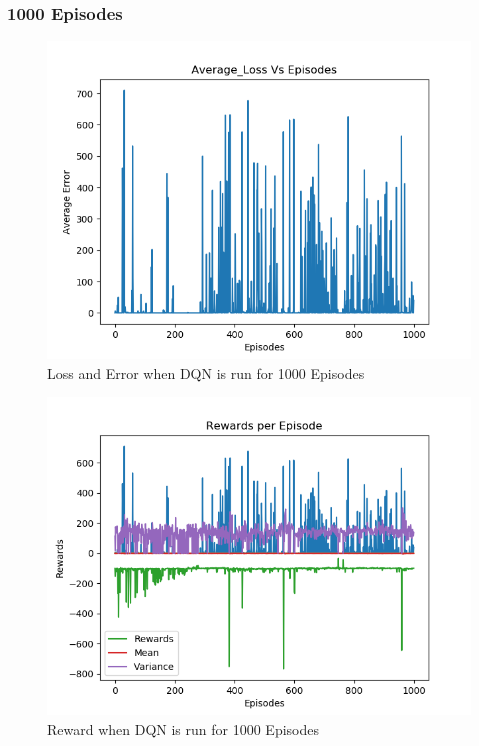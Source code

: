 \documentclass[doc, onecolumn, 12pt]{apa6}
\begin{document}
\FloatBarrier
\subsubsection{1000 Episodes}
\begin{figure}[H]
\label{DQN_1000Ep_Error}
\includegraphics[width =\textwidth, height=0.4 \textheight]{results/dqn/1000_ep/Error.png}
\caption{Loss and Error when DQN is run for 1000 Episodes}
\end{figure}

\begin{figure}

\includegraphics[width =\textwidth, height=0.4 \textheight]{results/dqn/1000_ep/Rewards.png}
\caption{Reward  when DQN is run for 1000 Episodes}
\label{DQN_1000Ep_Rewards}
\end{figure}
\end{document}
